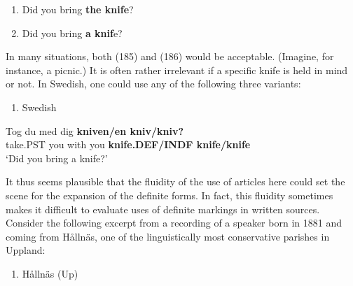 \begin{enumerate} %
\item 
\label{bkm:Ref123724733}Did you bring \textbf{the knife}?
\item 
\label{bkm:Ref123724734}Did you bring \textbf{a knif}e?
\end{enumerate} %
In many situations, both (185) and (186) would be acceptable. (Imagine, for instance, a picnic.) It is often rather irrelevant if a specific knife is held in mind or not. In Swedish, one could use any of the following three variants:

\begin{enumerate} %
\item 
Swedish

\end{enumerate} %
\ea\label{}
\gll Tog  du  med  dig  \textbf{kniven/en kniv/kniv?}\\


take.PST  you  with  you  \textbf{knife.DEF/INDF knife/knife}\\ %


‘Did you bring a knife?’
\z


It thus seems plausible that the fluidity of the use of articles here could set the scene for the expansion of the definite forms. In fact, this fluidity sometimes makes it difficult to evaluate uses of definite markings in written sources. Consider the following excerpt from a recording of a speaker born in 1881 and coming from Hållnäs, one of the linguistically most conservative parishes in Uppland:

\begin{enumerate} %
\item 
\label{bkm:Ref123725093}Hållnäs (Up)

\end{enumerate} %
\ea\label{}
\\


